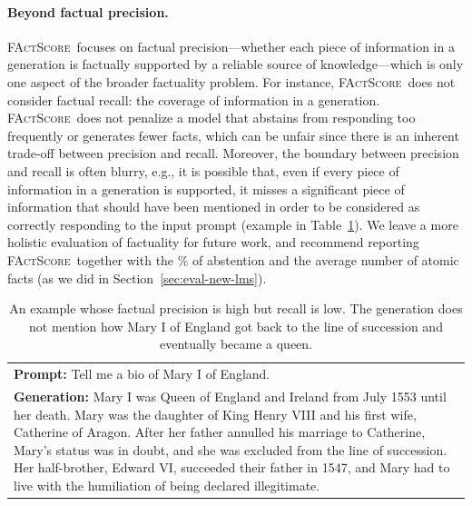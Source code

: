 \documentclass[11pt]{article}
\newcommand{\ours}{\textsc{FActScore}}
\newcommand{\kalpesh}[1]{\textcolor{brown}{[Kalpesh: #1]}
}
\begin{document}
\vspace{-.1em}
\paragraph{Beyond factual precision.}
\ours\ focuses on factual precision---whether each piece of information in a generation is factually supported by a reliable source of knowledge---which is only one aspect of the broader factuality problem.
For instance, \ours\ does not consider factual recall: the coverage of information in a generation.
\ours\ does not penalize a model that abstains from responding too frequently or generates fewer facts, which can be unfair since there is an inherent trade-off between precision and recall.
Moreover, the boundary between precision and recall is often blurry, e.g., it is possible that, even if every piece of information in a generation is supported, it misses a significant piece of information that should have been mentioned in order to be considered as correctly responding to the input prompt (example in Table~\ref{tab:recall}).
We leave a more holistic evaluation of factuality for future work, and recommend reporting \ours\ together with the \% of abstention and the average number of atomic facts (as we did in Section~\ref{sec:eval-new-lms}).

\begin{table}[t]
    \center \footnotesize
    \begin{tabular}{p{7.3cm}}
        \toprule        
           \textbf{Prompt:} Tell me a bio of Mary I of England. \\
           \textbf{Generation:}
           Mary I %
           was Queen of England and Ireland from July 1553 until her death. Mary was the daughter of King Henry VIII and his first wife, Catherine of Aragon. After her father annulled his marriage to Catherine, Mary’s status was in doubt, and she was excluded from the line of succession. Her half-brother, Edward VI, succeeded their father in 1547, and Mary had to live with the humiliation of being declared illegitimate. \\
        \bottomrule
    \end{tabular}
    \caption{An example whose factual precision is high but recall is low. The generation does not mention how Mary I of England got back to the line of succession and eventually became a queen. %
    \vspace{-.5em}
    }\label{tab:recall}
\end{table}
\end{document}
